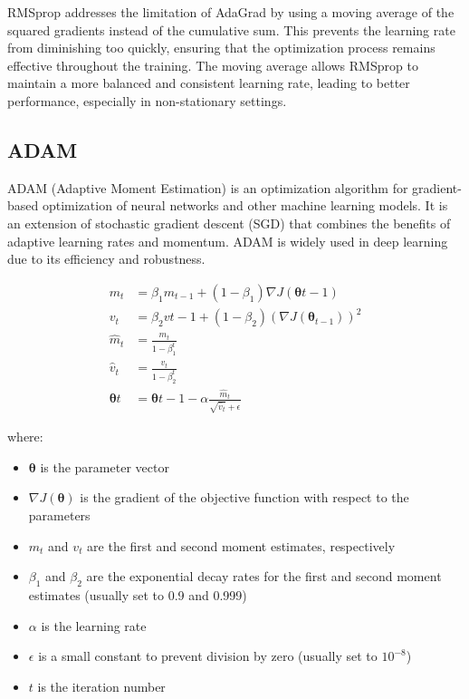 \documentclass[12pt]{article}
\begin{document}
RMSprop addresses the limitation of AdaGrad by using a moving average of the squared gradients instead of the cumulative sum. This prevents the learning rate from diminishing too quickly, ensuring that the optimization process remains effective throughout the training. The moving average allows RMSprop to maintain a more balanced and consistent learning rate, leading to better performance, especially in non-stationary settings.

\subsection{ADAM}

ADAM (Adaptive Moment Estimation) is an optimization algorithm for gradient-based optimization of neural networks and other machine learning models. It is an extension of stochastic gradient descent (SGD) that combines the benefits of adaptive learning rates and momentum. ADAM is widely used in deep learning due to its efficiency and robustness.

\begin{align*}
m_t &= \beta_1 m_{t-1} + (1 - \beta_1) \nabla J(\boldsymbol{\theta}{t-1}) \\
v_t &= \beta_2 v{t-1} + (1 - \beta_2) (\nabla J(\boldsymbol{\theta}_{t-1}))^2 \\
\hat{m}_t &= \frac{m_t}{1 - \beta_1^t} \\
\hat{v}_t &= \frac{v_t}{1 - \beta_2^t} \\
\boldsymbol{\theta}t &= \boldsymbol{\theta}{t-1} - \alpha \frac{\hat{m}_t}{\sqrt{\hat{v}_t} + \epsilon}
\end{align*}



where:
\begin{itemize}
\item $\boldsymbol{\theta}$ is the parameter vector
\item $\nabla J(\boldsymbol{\theta})$ is the gradient of the objective function with respect to the parameters
\item $m_t$ and $v_t$ are the first and second moment estimates, respectively
\item $\beta_1$ and $\beta_2$ are the exponential decay rates for the first and second moment estimates (usually set to 0.9 and 0.999)
\item $\alpha$ is the learning rate
\item $\epsilon$ is a small constant to prevent division by zero (usually set to $10^{-8}$)
\item $t$ is the iteration number
\end{itemize}
\end{document}
